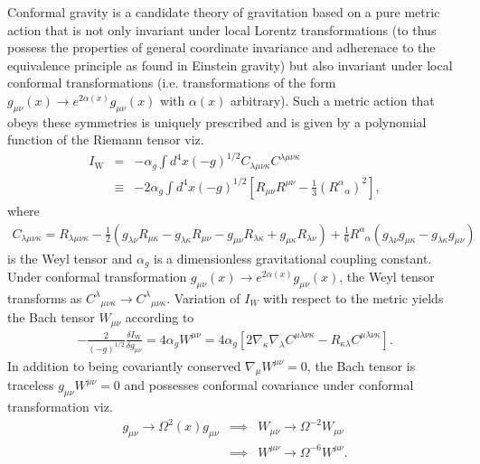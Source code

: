\documentclass[10pt,letterpaper]{article}
\numberwithin{equation}{section}
\begin{document}
\indent Conformal gravity is a candidate theory of gravitation based on a pure metric action that is not only invariant under local Lorentz transformations (to thus possess the properties of general coordinate invariance and adherenace to the equivalence principle as found in Einstein gravity) but also invariant under local conformal transformations (i.e. transformations of the form $g_{\mu\nu}(x) \to e^{2\alpha(x)}g_{\mu\nu}(x)$ with $\alpha(x)$ arbitrary). Such a metric action that obeys these symmetries is uniquely prescribed and is given by a polynomial function of the Riemann tensor viz.\cite{Mannheim2012a}
\begin{eqnarray}
I_\text{W} &=& -\alpha_g \int d^4x (-g)^{1/2}C_{\lambda\mu\nu\kappa}C^{\lambda\mu\nu\kappa}
\nonumber\\
&\equiv& -2\alpha_g \int d^4x(-g)^{1/2}\left[R_{\mu\nu}R^{\mu\nu} - \tfrac{1}{3}(R^\alpha{}_\alpha)^2\right],
\label{IW}
\end{eqnarray}
where
\begin{eqnarray}
C_{\lambda\mu\nu\kappa}= R_{\lambda\mu\nu\kappa}
-\frac{1}{2}\left(g_{\lambda\nu}R_{\mu\kappa}-
g_{\lambda\kappa}R_{\mu\nu}-
g_{\mu\nu}R_{\lambda\kappa}+
g_{\mu\kappa}R_{\lambda\nu}\right)
+\frac{1}{6}R^{\alpha}_{\phantom{\alpha}\alpha}\left(
g_{\lambda\nu}g_{\mu\kappa}-
g_{\lambda\kappa}g_{\mu\nu}\right)
\end{eqnarray}
is the Weyl tensor and $\alpha_g$ is a dimensionless gravitational coupling constant. Under conformal transformation $g_{\mu\nu}(x) \to e^{2\alpha(x)}g_{\mu\nu}(x)$, the Weyl tensor \cite{Bach1921} transforms as $C^\lambda{}_{\mu\nu\kappa} \to C^\lambda{}_{\mu\nu\kappa}$. Variation of $I_W$ with respect to the metric yields the Bach tensor $W_{\mu\nu}$ according to
\begin{eqnarray}
-\frac{2}{(-g)^{1/2}} \frac{\delta I_{\text{W}}}{\delta g_{\mu\nu}}= 4\alpha_gW^{\mu\nu} = 4\alpha_g \left[2\nabla_\kappa\nabla_\lambda C^{\mu\lambda\nu\kappa} - R_{\kappa\lambda}C^{\mu\lambda\nu\kappa}\right].
\label{Bachtensor}
\end{eqnarray}
In addition to being covariantly conserved $\nabla_\mu W^{\mu\nu} = 0$, the Bach tensor is traceless $g_{\mu\nu}W^{\mu\nu} = 0$ and possesses conformal covariance under conformal transformation viz.
\begin{eqnarray}
g_{\mu\nu} \to \Omega^2(x)g_{\mu\nu} &\implies& W_{\mu\nu} \to \Omega^{-2}W_{\mu\nu}
\nonumber\\
&\implies& W^{\mu\nu} \to \Omega^{-6}W^{\mu\nu}.
\end{eqnarray}
\end{document}
